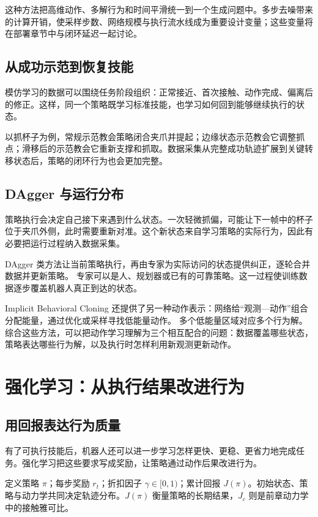 \documentclass[UTF8,a4paper,11pt,oneside,openany,fontset=none]{ctexbook}
\begin{document}
这种方法把高维动作、多解行为和时间平滑统一到一个生成问题中。多步去噪带来的计算开销，使采样步数、网络规模与执行流水线成为重要设计变量；这些变量将在部署章节中与闭环延迟一起讨论。

\section{从成功示范到恢复技能}

模仿学习的数据可以围绕任务阶段组织：正常接近、首次接触、动作完成、偏离后的修正。这样，同一个策略既学习标准技能，也学习如何回到能够继续执行的状态。

以抓杯子为例，常规示范教会策略闭合夹爪并提起；边缘状态示范教会它调整抓点；滑移后的示范教会它重新支撑和抓取。数据采集从完整成功轨迹扩展到关键转移状态后，策略的闭环行为也会更加完整。

\section{DAgger 与运行分布}\label{dagger-ux4e0eux8fd0ux884cux5206ux5e03}

策略执行会决定自己接下来遇到什么状态。一次轻微抓偏，可能让下一帧中的杯子位于夹爪外侧，此时需要重新对准。这个新状态来自学习策略的实际行为，因此有必要把运行过程纳入数据采集。

DAgger 类方法让当前策略执行，再由专家为实际访问的状态提供纠正，逐轮合并数据并更新策略。\cite{R43} 专家可以是人、规划器或已有的可靠策略。这一过程使训练数据逐步覆盖机器人真正到达的状态。

Implicit Behavioral Cloning 还提供了另一种动作表示：网络给``观测---动作''组合分配能量，通过优化或采样寻找低能量动作。\cite{R44} 多个低能量区域对应多个行为解。综合这些方法，可以把动作学习理解为三个相互配合的问题：数据覆盖哪些状态，策略表达哪些行为解，以及执行时怎样利用新观测更新动作。

\chapter{强化学习：从执行结果改进行为}

\section{用回报表达行为质量}

有了可执行技能后，机器人还可以进一步学习怎样更快、更稳、更省力地完成任务。强化学习把这些要求写成奖励，让策略通过动作后果改进行为。

定义策略 \(\pi\)；每步奖励 \(r_{t}\)；折扣因子 \(\gamma\in[0,1)\)；累计回报 \(J(\pi)\)。初始状态、策略与动力学共同决定轨迹分布。\(J(\pi)\) 衡量策略的长期结果，\(J_{c}\) 则是前章动力学中的接触雅可比。
\end{document}
